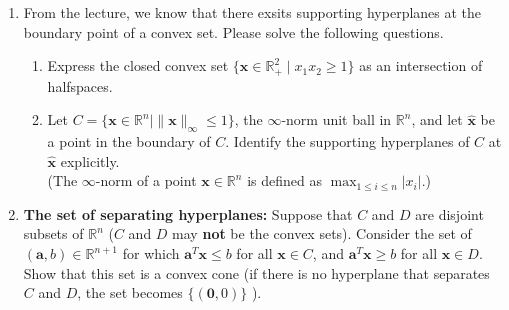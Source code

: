 \documentclass[11pt,letter,notitlepage]{article}
\begin{document}
\newpage
\begin{exercise}
    \begin{enumerate}
        \item From the lecture, we know that there exsits supporting hyperplanes at the boundary point of a convex set. Please solve the following questions.
        \begin{enumerate}
        \item Express the closed convex set $\{\mathbf{x} \in \mathbb{R}_{+}^2 \mid x_1x_2 \geq 1\}$ as an intersection of halfspaces.
        \item Let $C = \{\mathbf{x} \in \mathbb{R}^n \mid \|\mathbf{x}\|_\infty \leq 1\}$, the $\infty$-norm unit ball in $\mathbb{R}^n$, and let $\hat{\mathbf{x}}$ be a point in the boundary of $C$. Identify the supporting hyperplanes of $C$ at $\hat{\mathbf{x}}$ explicitly.\\
        (The $\infty$-norm of a point $\mathbf{x}\in\mathbb{R}^n$ is defined as $\max_{1\le i\le n}|x_i|$.)
        \end{enumerate}
        
        
        \item \textbf{The set of separating hyperplanes:} Suppose that $C$ and $D$ are disjoint subsets of $\mathbb{R}^n$ ($C$ and $D$ may \textbf{not} be the convex sets). Consider the set of $(\mathbf{a},b) \in \mathbb{R}^{n+1}$ for which $\mathbf{a}^T \mathbf{x} \leq b$ for all $\mathbf{x} \in C$, and $\mathbf{a}^T \mathbf{x} \geq b$ for all $\mathbf{x} \in D$. Show that this set is a convex cone (if there is no hyperplane that separates $C$ and $D$, the set becomes $\{(\mathbf{0},0)\}$ ).
    \end{enumerate}
\end{exercise}
\end{document}
